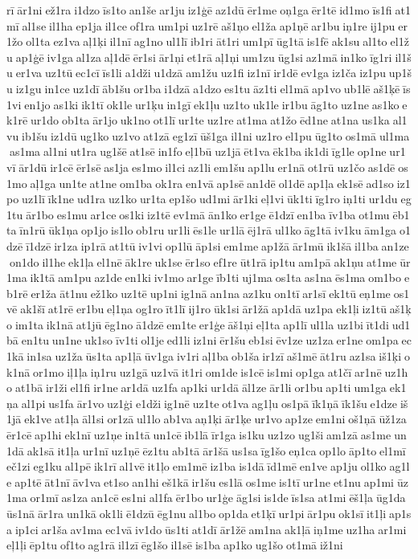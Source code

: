 rī ār1ni ež1ra i1dzo īs1to an1še ar1ju iz1ģē az1dū ēr1me oņ1ga ēr1tē id1mo īs1fi at1mī al1se il1ha ep1ja il1ce of1ra um1pi uz1rē aš1ņo el1ža ap1ņē ar1bu iņ1re ij1pu er1žo ol1ta ez1va aļ1ķi il1nī ag1no ul1lī ib1ri āt1ri um1pī ūg1tā is1fē ak1su al1to el1žu ap1ģē iv1ga al1za aļ1dē ēr1si ār1ņi et1rā aļ1ņi um1zu ūg1si az1mā in1ko īg1ri il1šu er1va uz1tū ec1cī īs1li a1dži u1dzā am1žu uz1fi iz1nī ir1dē ev1ga iz1ča iz1pu up1šu iz1gu in1ce uz1dī āb1šu or1ba i1dzā a1dzo es1tu āz1ti el1mā ap1vo ub1lē aš1ķē īs1vi en1jo as1ki ik1tī ok1le ur1ķu in1gī ek1ļu uz1to uk1le ir1bu āg1to uz1ne as1ko ek1rē ur1do ob1ta ār1jo uk1no ot1lī ur1te uz1re at1ma at1žo ēd1ne at1na us1ka al1vu ib1šu iz1dū ug1ko uz1vo at1zā eg1zī ūš1ga il1ni uz1ro el1pu ūg1to os1mā ul1ma as1ma al1ni ut1ra ug1šē at1sē in1fo eļ1bū uz1jā ēt1va ēk1ba ik1di īg1le op1ne ur1vī ār1dū ir1cē ēr1sē as1ja es1mo il1ci az1li em1šu ap1lu er1nā ot1rū uz1čo as1dē os1mo aļ1ga un1te at1ne om1ba ok1ra en1vā ap1sē an1dē ol1dē ap1ļa ek1sē ad1so iz1po uz1lī īk1ne ud1ra uz1ko ur1ta ep1šo ud1mi ār1ki eļ1vi ūk1ti īg1ro iņ1ti ur1du eg1tu ār1bo es1mu ar1ce os1ki iz1tē ev1mā ān1ko er1ge ē1dzī en1ba īv1ba ot1mu ēb1ta īn1rū ūk1ņa op1jo is1lo ob1ru ur1li ēs1le ur1lā ēj1rā ul1ko āg1tā iv1ku ām1ga o1dzē ī1dzē ir1za ip1rā at1tū iv1vi op1lū āp1si em1me ap1žā ār1mū ik1šā il1ba an1ze on1do il1he ek1ļa el1nē āk1re uk1se ēr1so ef1re ūt1rā ip1tu am1pā ak1ņu at1me ūr1ma ik1tā am1pu az1de en1ki iv1mo ar1ge īb1ti uj1ma os1ta as1na ēs1ma om1bo eb1rē er1ža āt1nu ež1ko uz1tē up1ni ig1nā an1na az1ku on1tī ar1sī ek1tū eņ1me os1vē ak1šī at1rē er1bu eļ1ņa og1ro īt1lī ij1ro ūk1si ār1žā ap1dā uz1pa ek1ļi iz1tū aš1ķo im1ta ik1nā at1jū ēg1no ā1dzē em1te er1ģe āš1ņi eļ1ta ap1lī ul1la uz1bi īt1di ud1bā en1tu un1ne uk1so īv1ti ol1je ed1li iz1ni ēr1šu eb1si ēv1ze uz1za er1ne om1pa ec1kā in1sa uz1ža ūs1ta ap1ļā ūv1ga iv1ri aļ1ba ob1ša ir1zī aš1mē āt1ru az1sa iš1ķi ok1nā or1mo iļ1ļa iņ1ru uz1gā uz1vā it1ri om1de is1cē is1mi op1ga at1čī ar1nē uz1ho at1bā ir1ži el1fi ir1ne ar1dā uz1fa ap1ki ur1dā āl1ze ār1li or1bu ap1ti um1ga ek1ņa al1pi us1fa ār1vo uz1ģi e1dži ig1nē uz1te ot1va ag1ļu os1pā īk1ņā īk1šu e1dze iš1jā ek1ve at1ļa āl1si or1zā ul1lo ab1va aņ1ķi ār1ķe ur1vo ap1ze em1ni oš1ņā ūž1za ēr1cē ap1hi ek1nī uz1ņe in1tā un1cē ib1lā īr1ga is1ku uz1zo ug1ši am1zā as1me un1dā ak1sā it1ļa ur1nī uz1ņē ēz1tu ab1tā ār1šā us1sa īg1šo eņ1ca op1lo āp1to el1mī eč1zi eg1ku al1pē ik1rī al1vē it1ļo em1mē iz1ba is1dā īd1mē en1ve ap1ju ol1ko ag1le ap1tē āt1nī āv1va et1so an1hi eš1kā ir1šu es1lā os1me is1tī ur1ne et1nu ap1mi ūz1ma or1mī as1za an1cē es1ni al1fa ēr1bo ur1ģe āg1si is1de īs1sa at1mi ēš1ļa ūg1da ūs1nā ār1ra un1kā ok1li ē1dzū ēg1nu al1bo op1da et1ķī ur1pi ār1pu ok1sī it1ļi ap1sa ip1ci ar1ša av1ma ec1vā iv1do ūs1ti at1dī ār1žē am1na ak1ļā iņ1me uz1ha ar1mi eļ1ļi ēp1tu of1to ag1rā il1zī ēg1šo il1sē is1ba ap1ko ug1šo ot1mā iž1ni 
